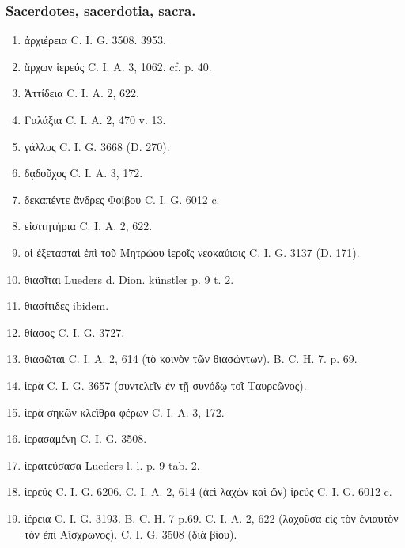 \documentclass[a4paper, 11pt, oneside, polutonikogreek, german]{article}
\begin{document}
\subsubsection{Sacerdotes, sacerdotia, sacra.}
\begin{enumerate}
\item ἀρχιέρεια C. I. G. 3508. 3953.

\item ἄρχων ἱερεύς C. I. A. 3, 1062. cf. p. 40.

\item Ἀττίδεια C. I. A. 2, 622.

\item Γαλάξια C. I. A. 2, 470 v. 13.

\item γάλλος C. I. G. 3668 (D. 270).

\item δᾳδοῦχος C. I. A. 3, 172.

\item δεκαπέντε ἄνδρες Φοίβου C. I. G. 6012 c.

\item εἰσιτητήρια C. I. A. 2, 622.

\item οἱ ἐξετασταὶ ἐπὶ τοῦ Μητρώου ἱεροῖς νεοκαύιοις C. I. G. 3137 (D. 171).

\item θιασῖται Lueders d. Dion. künstler p. 9 t. 2.

\item θιασίτιδες ibidem.

\item θίασος C. I. G. 3727.

\item θιασῶται C. I. A. 2, 614 (τὸ κοινὸν τῶν θιασώντων). B. C. H. 7. p. 69.

\item ἱερὰ C. I. G. 3657 (συντελεῖν ἐν τῇ συνόδῳ τοῖ Ταυρεῶνος).

\item ἱερὰ σηκῶν κλεῖθρα φέρων C. I. A. 3, 172.

\item ἱερασαμένη C. I. G. 3508.

\item ἱερατεύσασα Lueders l. l. p. 9 tab. 2.

\item ἱερεύς C. I. G. 6206. C. I. A. 2, 614 (ἀεὶ λαχὼν καὶ ὤν) ἱρεύς C. I. G. 6012 c.

\item ἱέρεια C. I. G. 3193. B. C. H. 7 p.69. C. I. A. 2, 622 (λαχοῦσα εἰς τὸν ἐνιαυτὸν τὸν ἐπὶ Αἴσχρωνος). C. I. G. 3508 (διὰ βίου).


\end{enumerate}
\end{document}
